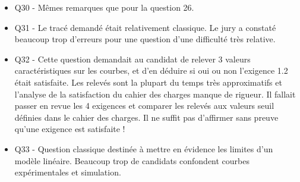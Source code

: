 \documentclass[10pt,fleqn]{article} %
\begin{document}
\begin{itemize}
\item Q30 - Mêmes remarques que pour la question 26.
\item Q31 - Le tracé demandé était relativement classique. Le jury a constaté beaucoup trop d’erreurs pour
une question d’une difficulté très relative.
\item Q32 - Cette question demandait au candidat de relever 3 valeurs caractéristiques sur les courbes,
et d’en déduire si oui ou non l’exigence 1.2 était satisfaite. Les relevés sont la plupart du temps très
approximatifs et l’analyse de la satisfaction du cahier des charges manque de rigueur. Il fallait passer
en revue les 4 exigences et comparer les relevés aux valeurs seuil définies dans le cahier des charges. Il
ne suffit pas d’affirmer sans preuve qu’une exigence est satisfaite !
\item Q33 - Question classique destinée à mettre en évidence les limites d’un modèle linéaire. Beaucoup
trop de candidats confondent courbes expérimentales et simulation.
\end{itemize}
\end{document}

